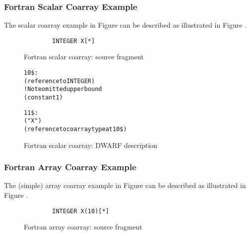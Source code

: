 \subsubsection{Fortran Scalar Coarray Example}
The  scalar coarray example
in Figure  can be described as 
illustrated in Figure .

\begin{figure}[!h]
\begin{lstlisting}
        INTEGER X[*]
\end{lstlisting}
\caption{Fortran scalar coarray: source fragment}
\label{fig:Fortranscalarcoarraysourcefragment}
\end{figure}

\begin{figure}[!h]
\begin{dwflisting}
\begin{alltt}
10\$:  \DWTAGcoarraytype
        \DWATtype(reference to INTEGER)
        \DWTAGsubrangetype                ! Note omitted upper bound			
            \DWATlowerbound(constant 1)

11\$:  \DWTAGvariable
        \DWATname("X")
        \DWATtype(reference to coarray type at 10\$)
\end{alltt}
\end{dwflisting}
\caption{Fortran scalar coarray: DWARF description}
\label{fig:FortranscalarcoarrayDWARFdescription}
\end{figure}

\subsubsection{Fortran Array Coarray Example}
The  (simple) array coarray example
in Figure  can be described as 
illustrated in Figure .

\begin{figure}[here]
\begin{lstlisting}
        INTEGER X(10)[*]
\end{lstlisting}
\caption{Fortran array coarray: source fragment}
\label{fig:Fortranarraycoarraysourcefragment}
\end{figure}

